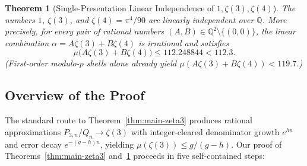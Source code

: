 \documentclass[11pt,reqno]{amsart}
\newtheorem{theorem}{Theorem}[section]
\theoremstyle{definition}
\theoremstyle{remark}
\newcommand{\QQ}{\mathbb{Q}}
\begin{document}
\begin{theorem}[Single-Presentation Linear Independence of $1, \zeta(3), \zeta(4)$]
\label{thm:main-joint}
The numbers $1$, $\zeta(3)$, and $\zeta(4) = \pi^4/90$ are linearly independent over $\QQ$. More precisely, for every pair of rational numbers $(A, B) \in \QQ^2 \setminus \{(0, 0)\}$, the linear combination $\alpha = A\zeta(3) + B\zeta(4)$ is irrational and satisfies
\[
  \mu\bigl(A\zeta(3) + B\zeta(4)\bigr) \le 112.248844 < 112.3.
\]
(First-order modulo-$p$ shells alone already yield $\mu(A\zeta(3) + B\zeta(4)) < 119.7$.)
\end{theorem}

\subsection{Overview of the Proof}
The standard route to Theorem~\ref{thm:main-zeta3} produces rational approximations $P_{3,n}/Q_n \to \zeta(3)$ with integer-cleared denominator growth $e^{h n}$ and error decay $e^{-(g-h)n}$, yielding $\mu(\zeta(3)) \le g/(g-h)$. Our proof of Theorems~\ref{thm:main-zeta3} and~\ref{thm:main-joint} proceeds in five self-contained steps:
\end{document}
